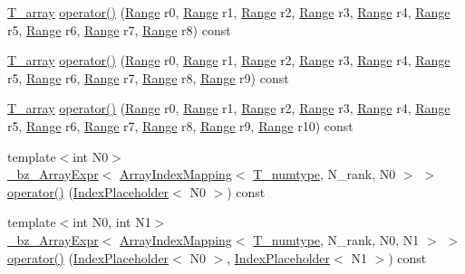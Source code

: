 \begin{DoxyCompactItemize}
\item 
\hyperlink{classArray_a6a3d9b6a214107a10df219091801f1e0}{T\+\_\+array} \hyperlink{classArray_af10d31d5f873244b7dfde21c16c11d1c}{operator()} (\hyperlink{classRange}{Range} r0, \hyperlink{classRange}{Range} r1, \hyperlink{classRange}{Range} r2, \hyperlink{classRange}{Range} r3, \hyperlink{classRange}{Range} r4, \hyperlink{classRange}{Range} r5, \hyperlink{classRange}{Range} r6, \hyperlink{classRange}{Range} r7, \hyperlink{classRange}{Range} r8) const 
\item 
\hyperlink{classArray_a6a3d9b6a214107a10df219091801f1e0}{T\+\_\+array} \hyperlink{classArray_a1cc4d575d988f8e881486bd5b3e34121}{operator()} (\hyperlink{classRange}{Range} r0, \hyperlink{classRange}{Range} r1, \hyperlink{classRange}{Range} r2, \hyperlink{classRange}{Range} r3, \hyperlink{classRange}{Range} r4, \hyperlink{classRange}{Range} r5, \hyperlink{classRange}{Range} r6, \hyperlink{classRange}{Range} r7, \hyperlink{classRange}{Range} r8, \hyperlink{classRange}{Range} r9) const 
\item 
\hyperlink{classArray_a6a3d9b6a214107a10df219091801f1e0}{T\+\_\+array} \hyperlink{classArray_a23c20788f30e00e26dd3b4b865f21d26}{operator()} (\hyperlink{classRange}{Range} r0, \hyperlink{classRange}{Range} r1, \hyperlink{classRange}{Range} r2, \hyperlink{classRange}{Range} r3, \hyperlink{classRange}{Range} r4, \hyperlink{classRange}{Range} r5, \hyperlink{classRange}{Range} r6, \hyperlink{classRange}{Range} r7, \hyperlink{classRange}{Range} r8, \hyperlink{classRange}{Range} r9, \hyperlink{classRange}{Range} r10) const 
\item 
{\footnotesize template$<$int N0$>$ }\\\hyperlink{class__bz__ArrayExpr}{\+\_\+bz\+\_\+\+Array\+Expr}$<$ \hyperlink{classArrayIndexMapping}{Array\+Index\+Mapping}$<$ \hyperlink{classArray_ae72770f4a1d2f8b7193badafc320f008}{T\+\_\+numtype}, N\+\_\+rank, N0 $>$ $>$ \hyperlink{classArray_a7b39e1ab8d15693612449827f3333c64}{operator()} (\hyperlink{classIndexPlaceholder}{Index\+Placeholder}$<$ N0 $>$) const 
\item 
{\footnotesize template$<$int N0, int N1$>$ }\\\hyperlink{class__bz__ArrayExpr}{\+\_\+bz\+\_\+\+Array\+Expr}$<$ \hyperlink{classArrayIndexMapping}{Array\+Index\+Mapping}$<$ \hyperlink{classArray_ae72770f4a1d2f8b7193badafc320f008}{T\+\_\+numtype}, N\+\_\+rank, N0, N1 $>$ $>$ \hyperlink{classArray_a7b9f179fb0fbf28fed8213be7006b879}{operator()} (\hyperlink{classIndexPlaceholder}{Index\+Placeholder}$<$ N0 $>$, \hyperlink{classIndexPlaceholder}{Index\+Placeholder}$<$ N1 $>$) const 

\end{DoxyCompactItemize}
